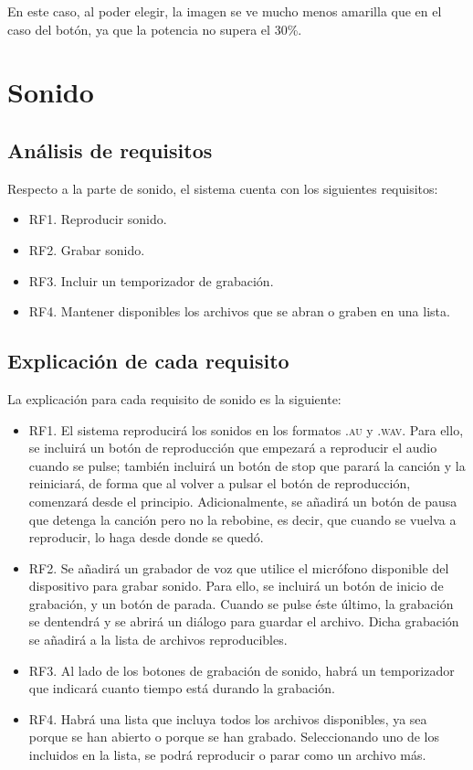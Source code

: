 \documentclass[11pt,a4paper]{article}
\begin{document}
En este caso, al poder elegir, la imagen se ve mucho menos amarilla que en el caso del botón, ya que la potencia no supera el 30\%.

\newpage

\section{Sonido}

\subsection{Análisis de requisitos}
Respecto a la parte de sonido, el sistema cuenta con los siguientes requisitos:

\begin{itemize}
	\item RF1. Reproducir sonido.
	\item RF2. Grabar sonido.
	\item RF3. Incluir un temporizador de grabación.
	\item RF4. Mantener disponibles los archivos que se abran o graben en una lista.
\end{itemize}

\subsection{Explicación de cada requisito}
La explicación para cada requisito de sonido es la siguiente:

\begin{itemize}
	\item RF1. El sistema reproducirá los sonidos en los formatos \textsc{.au} y \textsc{.wav}. Para ello, se incluirá un botón de reproducción que empezará a reproducir el audio cuando se pulse; también incluirá un botón de stop que parará la canción y la reiniciará, de forma que al volver a pulsar el botón de reproducción, comenzará desde el principio. Adicionalmente, se añadirá un botón de pausa que detenga la canción pero no la rebobine, es decir, que cuando se vuelva a reproducir, lo haga desde donde se quedó.
	\item RF2. Se añadirá un grabador de voz que utilice el micrófono disponible del dispositivo para grabar sonido. Para ello, se incluirá un botón de inicio de grabación, y un botón de parada. Cuando se pulse éste último, la grabación se dentendrá y se abrirá un diálogo para guardar el archivo. Dicha grabación se añadirá a la lista de archivos reproducibles.
	\item RF3. Al lado de los botones de grabación de sonido, habrá un temporizador que indicará cuanto tiempo está durando la grabación.
	\item RF4. Habrá una lista que incluya todos los archivos disponibles, ya sea porque se han abierto o porque se han grabado. Seleccionando uno de los incluidos en la lista, se podrá reproducir o parar como un archivo más.
\end{itemize}
\end{document}
